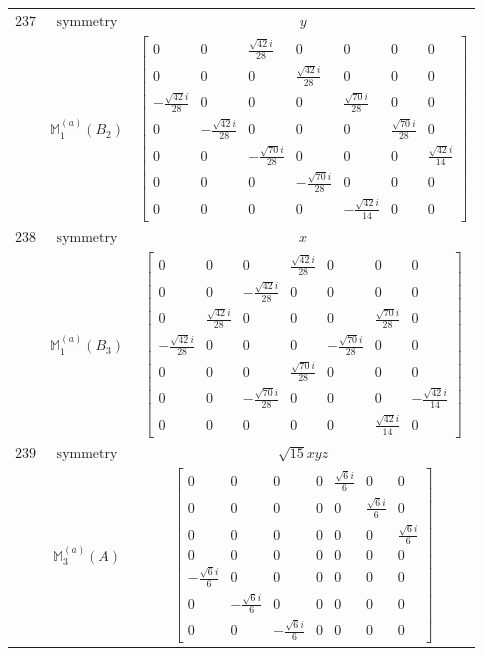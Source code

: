 \documentclass[fleqn,8pt,landscape]{jsarticle}
\begin{document}
\begin{longtable}{ccc}
$ 237 $ & $ \text{symmetry} $ & $ y $ \\
$  $ & $ \mathbb{M}_{1}^{(a)}(B_{2}) $ & $ \begin{bmatrix} 0 & 0 & \frac{\sqrt{42} i}{28} & 0 & 0 & 0 & 0 \\ 0 & 0 & 0 & \frac{\sqrt{42} i}{28} & 0 & 0 & 0 \\ - \frac{\sqrt{42} i}{28} & 0 & 0 & 0 & \frac{\sqrt{70} i}{28} & 0 & 0 \\ 0 & - \frac{\sqrt{42} i}{28} & 0 & 0 & 0 & \frac{\sqrt{70} i}{28} & 0 \\ 0 & 0 & - \frac{\sqrt{70} i}{28} & 0 & 0 & 0 & \frac{\sqrt{42} i}{14} \\ 0 & 0 & 0 & - \frac{\sqrt{70} i}{28} & 0 & 0 & 0 \\ 0 & 0 & 0 & 0 & - \frac{\sqrt{42} i}{14} & 0 & 0 \end{bmatrix} $ \\ \hline
$ 238 $ & $ \text{symmetry} $ & $ x $ \\
$  $ & $ \mathbb{M}_{1}^{(a)}(B_{3}) $ & $ \begin{bmatrix} 0 & 0 & 0 & \frac{\sqrt{42} i}{28} & 0 & 0 & 0 \\ 0 & 0 & - \frac{\sqrt{42} i}{28} & 0 & 0 & 0 & 0 \\ 0 & \frac{\sqrt{42} i}{28} & 0 & 0 & 0 & \frac{\sqrt{70} i}{28} & 0 \\ - \frac{\sqrt{42} i}{28} & 0 & 0 & 0 & - \frac{\sqrt{70} i}{28} & 0 & 0 \\ 0 & 0 & 0 & \frac{\sqrt{70} i}{28} & 0 & 0 & 0 \\ 0 & 0 & - \frac{\sqrt{70} i}{28} & 0 & 0 & 0 & - \frac{\sqrt{42} i}{14} \\ 0 & 0 & 0 & 0 & 0 & \frac{\sqrt{42} i}{14} & 0 \end{bmatrix} $ \\ \hline
$ 239 $ & $ \text{symmetry} $ & $ \sqrt{15} x y z $ \\
$  $ & $ \mathbb{M}_{3}^{(a)}(A) $ & $ \begin{bmatrix} 0 & 0 & 0 & 0 & \frac{\sqrt{6} i}{6} & 0 & 0 \\ 0 & 0 & 0 & 0 & 0 & \frac{\sqrt{6} i}{6} & 0 \\ 0 & 0 & 0 & 0 & 0 & 0 & \frac{\sqrt{6} i}{6} \\ 0 & 0 & 0 & 0 & 0 & 0 & 0 \\ - \frac{\sqrt{6} i}{6} & 0 & 0 & 0 & 0 & 0 & 0 \\ 0 & - \frac{\sqrt{6} i}{6} & 0 & 0 & 0 & 0 & 0 \\ 0 & 0 & - \frac{\sqrt{6} i}{6} & 0 & 0 & 0 & 0 \end{bmatrix} $ \\ \hline

\end{longtable}
\end{document}
